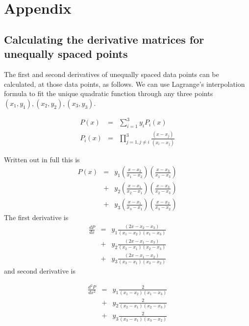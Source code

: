 \documentclass{article}
\begin{document}
\section{Appendix}
\subsection{Calculating the derivative matrices for unequally spaced points}

The first and second derivatives of unequally spaced data points can be calculated, at those data points,
as follows. We can use Lagrange's interpolation formula to fit the unique quadratic function through any
three points $(x_1,y_1), (x_2,y_2), (x_3, y_3)$.

\begin{eqnarray}
P(x) & = & \sum_{i=1}^{3} y_i P_i(x) \\
P_i(x) & = & \prod_{j=1, j \ne i}^{3} \frac{\left( x-x_j \right)}{ \left( x_i - x_j \right)}
\end{eqnarray}

Written out in full this is
\begin{eqnarray}
P(x) & = & y_1 \left(\frac{x-x_2}{x_1-x_2}\right) \left( \frac{x-x_3}{x_1-x_3}\right) \nonumber \\
     & + & y_2 \left(\frac{x-x_1}{x_2-x_1}\right) \left( \frac{x-x_3}{x_2-x_3}\right) \nonumber \\
     & + & y_3 \left(\frac{x-x_1}{x_3-x_1}\right) \left( \frac{x-x_2}{x_3-x_2}\right) \nonumber
\end{eqnarray}
The first derivative is
\begin{eqnarray}
\frac{dP}{dx} & = & y_1 \frac{\left(2x-x_2-x_3 \right)}{\left(x_1-x_2\right)\left(x_1-x_3\right)} \nonumber \\
     & + & y_2 \frac{\left(2x-x_1-x_3 \right)}{\left(x_2-x_1\right)\left(x_2-x_3\right)} \nonumber \\
     & + & y_3 \frac{\left(2x-x_1-x_2 \right)}{\left(x_3-x_1\right)\left(x_3-x_2\right)} \nonumber
\end{eqnarray}
and second derivative is

\begin{eqnarray}
\frac{d^2P}{dx^2} & = & y_1 \frac{2}{\left(x_1-x_2\right)\left(x_1-x_3\right)} \nonumber \\
     & + & y_2 \frac{2}{\left(x_2-x_1\right)\left(x_2-x_3\right)} \nonumber \\
     & + & y_3 \frac{2}{\left(x_3-x_1\right)\left(x_3-x_2\right)} \nonumber
\end{eqnarray}
\end{document}
